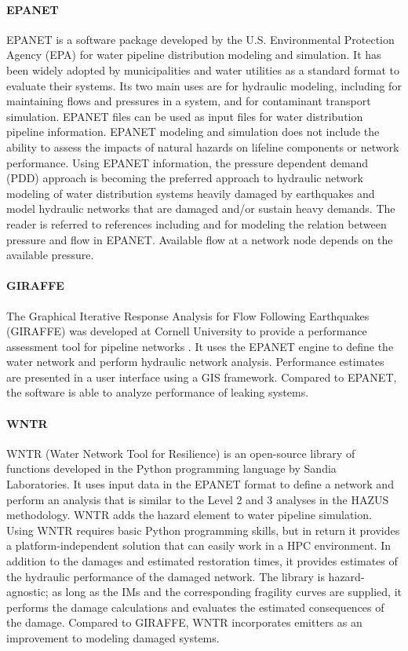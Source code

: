 \paragraph{EPANET} EPANET is a software package developed by the U.S. Environmental Protection Agency (EPA) for water pipeline distribution modeling and simulation. It has been widely adopted by municipalities and water utilities as a standard format to evaluate their systems. Its two main uses are for hydraulic modeling, including for maintaining flows and pressures in a system, and for contaminant transport simulation. EPANET files can be used as input files for water distribution pipeline information. EPANET modeling and simulation does not include the ability to assess the impacts of natural hazards on lifeline components or network performance. Using EPANET information, the pressure dependent demand (PDD) approach is becoming the preferred approach to hydraulic network modeling of water distribution systems heavily damaged by earthquakes and model hydraulic networks that are damaged and/or sustain heavy demands. The reader is referred to references including \cite{jun2013iterative} and \cite{sayyed2014modelling} for modeling the relation between pressure and flow in EPANET. Available flow at a network node depends on the available pressure.

\paragraph{GIRAFFE} The Graphical Iterative Response Analysis for Flow Following Earthquakes (GIRAFFE) was developed at Cornell University to provide a performance assessment tool for pipeline networks \citep{wang2008seismic}. It uses the EPANET engine to define the water network and perform hydraulic network analysis. Performance estimates are presented in a user interface using a GIS framework. Compared to EPANET, the software is able to analyze performance of leaking systems.

\paragraph{WNTR} WNTR (Water Network Tool for Resilience) is an open-source library of functions developed in the Python programming language by Sandia Laboratories. It uses input data in the EPANET format to define a network and perform an analysis that is similar to the Level 2 and 3 analyses in the HAZUS methodology. WNTR adds the hazard element to water pipeline simulation. Using WNTR requires basic Python programming skills, but in return it provides a platform-independent solution that can easily work in a HPC environment. In addition to the damages and estimated restoration times, it provides estimates of the hydraulic performance of the damaged network. The library is hazard-agnostic; as long as the IMs and the corresponding fragility curves are supplied, it performs the damage calculations and evaluates the estimated consequences of the damage. Compared to GIRAFFE, WNTR incorporates emitters as an improvement to modeling damaged systems.

